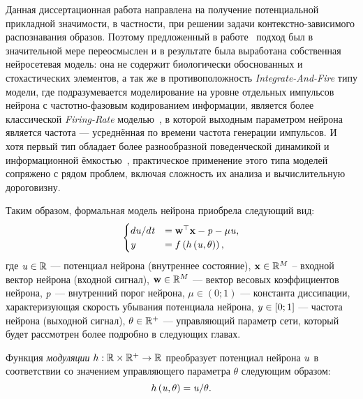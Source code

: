 Данная диссертационная работа направлена на получение потенциальной прикладной значимости, в частности, при решении задачи контекстно-зависимого распознавания образов. Поэтому предложенный в работе~\cite{EmelyanovYaroslavsky1990} подход был в значительной мере переосмыслен и в результате была выработана собственная нейросетевая модель: она не содержит биологически обоснованных и стохастических элементов, а так же в противоположность \textit{Integrate-And-Fire} типу модели, где подразумевается моделирование на уровне отдельных импульсов нейрона с частотно-фазовым кодированием информации, является более классической \textit{Firing-Rate}  моделью~\cite{Dayan2001}, в которой выходным параметром нейрона является \socalled частота --- усреднённая по времени частота генерации импульсов. И хотя первый тип обладает более разнообразной поведенческой динамикой и информационной ёмкостью~\cite{Izhikevich2006}, практическое применение этого типа моделей сопряжено с рядом проблем, включая сложность их анализа и вычислительную дороговизну.

Таким образом, формальная модель нейрона приобрела следующий вид:
\begin{equation}
	\label{eq:full_single_neuron_model}
    \begin{cases}
        d\mathit{u} / d\mathit{t}   &=  \mathrm{\mathbf{w}}^{\top} \mathrm{\mathbf{x}} - \mathit{p} - \mu \mathit{u}, \\
        \mathit{y}                  &=  f\left( h\left( \mathit{u}, \theta \right) \right), \\
    \end{cases}
\end{equation}
где $\mathit{u} \in \mathbb{R}$ --- потенциал нейрона (внутреннее состояние), $\mathrm{\mathbf{x}} \in \mathbb{R}^{M}$ -- входной вектор нейрона (входной сигнал), $\mathrm{\mathbf{w}} \in \mathbb{R}^{M}$ --- вектор весовых коэффициентов нейрона,  $\mathit{p}$ --- внутренний порог нейрона, $\mu \in \left(0;1\right)$ --- константа диссипации, характеризующая скорость убывания потенциала нейрона, $\mathit{y} \in \left[0;1\right]$ --- частота нейрона (выходной сигнал), $\theta \in \mathbb{R}^{+}$ --- управляющий параметр сети, который будет рассмотрен более подробно в следующих главах.

Функция \textit{модуляции} $h: \mathbb{R} \times \mathbb{R}^{+} \to \mathbb{R}$ преобразует потенциал нейрона $\mathit{u}$ в соответствии со значением управляющего параметра $\theta$ следующим образом:
\begin{equation}
    \label{eq:h_function}
    h\left( \mathit{u}, \theta \right) = \mathit{u} / \theta.
\end{equation}

